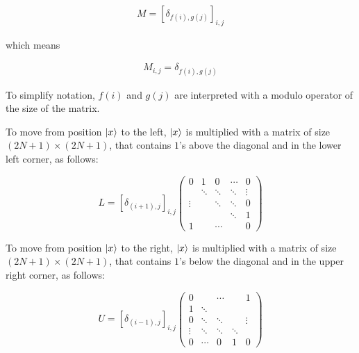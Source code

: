 \begin{align}
    M = [\delta_{f(i),g(j)}]_{i,j}
\end{align}

which means

\begin{align}
M_{i,j} = \delta_{f(i),g(j)}
\end{align}

To simplify notation, $f(i)$ and $g(j)$ are interpreted with a modulo operator of the size of the matrix.


To move from position $\ket{x}$ to the left, $\ket{x}$ is multiplied with a matrix of size $(2N+1)\times(2N+1)$, that contains $1$'s above the diagonal and in the lower left corner, as follows:

\begin{center}
  \[ L = [\delta_{(i+1),j}]_{i,j}
    \left(
    \begin{array}{ccccc}
        0      & 1      & 0      & \cdots & 0      \\
               & \ddots & \ddots & \ddots & \vdots \\
        \vdots &        & \ddots & \ddots & 0      \\
               &        &        & \ddots & 1      \\
        1      &        & \cdots &        & 0
      \end{array}
    \right)
  \]
\end{center}


To move from position $\ket{x}$ to the right, $\ket{x}$ is multiplied with a matrix of size $(2N+1)\times(2N+1)$, that contains $1$'s below the diagonal and in the upper right corner, as follows:

\begin{center}
  \[ U = [\delta_{(i-1),j}]_{i,j}
    \left(
    \begin{array}{ccccc}

        0      &        & \cdots &        & 1      \\
        1      & \ddots &        &        &        \\
        0      & \ddots & \ddots &        & \vdots \\
        \vdots & \ddots & \ddots & \ddots &        \\
        0      & \cdots & 0      & 1      & 0
      \end{array}
    \right)
  \]
\end{center}

